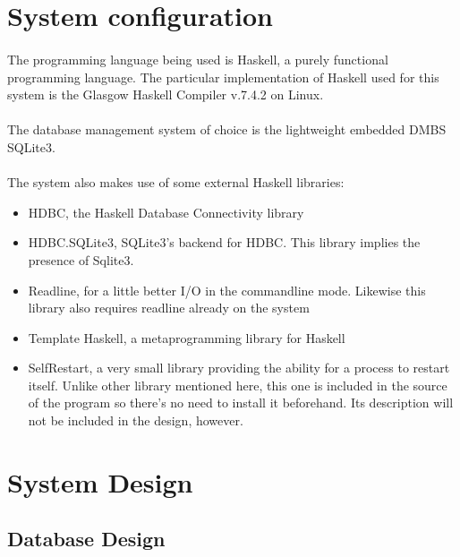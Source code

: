 \documentclass[../gr-final.tex]{subfiles}
\begin{document}
\section{System configuration}

\paragraph{}The programming language being used is Haskell, a purely functional programming language. The particular implementation of Haskell used for this system is the Glasgow  Haskell Compiler v.7.4.2 on Linux.

\paragraph{}The database management system of choice is the lightweight embedded DMBS SQLite3. 

\paragraph{}The system also makes use of some external Haskell libraries: 

\begin{itemize}
\item HDBC, the Haskell Database Connectivity library
\item HDBC.SQLite3, SQLite3's backend for HDBC. This library implies
  the presence of Sqlite3.
\item Readline, for a little better I/O in the
  commandline mode. Likewise this library also requires readline
  already on the system
\item Template Haskell, a metaprogramming library for Haskell
\item SelfRestart, a very small library providing the ability for a
  process to restart itself. Unlike other library mentioned here, this
  one is included in the source of the program so there's no need to
  install it beforehand. Its description will not be included in
  the design, however.
  
\end{itemize}



\section{System Design}
\subsection{Database Design}
\end{document}
